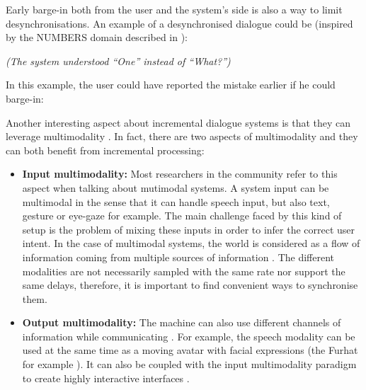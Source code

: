                   Early barge-in both from the user and the system's side is also a way to limit desynchronisations. An example of a desynchronised dialogue could be (inspired by the NUMBERS domain described in \cite{Skantze2009}):
                  
                  \begin{dialogue}
                     \textit{(The system understood ``One'' instead of ``What?'')}
                    \end{dialogue}
                    
                    In this example, the user could have reported the mistake earlier if he could barge-in:
                    
                    \begin{dialogue}
                      \end{dialogue}
                      
                      Another interesting aspect about incremental dialogue systems is that they can leverage multimodality \cite{Fink1998}. In fact, there are two aspects of multimodality and they can both benefit from incremental processing:
                      
                      \begin{itemize}
                           \item \textbf{Input multimodality:} Most researchers in the community refer to this aspect when talking about mutimodal systems. A system input can be multimodal in the sense that it can handle speech input, but also text, gesture or eye-gaze for example. The main challenge faced by this kind of setup is the problem of mixing these inputs in order to infer the correct user intent. In the case of multimodal systems, the world is considered as a flow of information coming from multiple sources of information \cite{Chao2012,Rosenthal2013}. The different modalities are not necessarily sampled with the same rate nor support the same delays, therefore, it is important to find convenient ways to synchronise them.
                                \item \textbf{Output multimodality:} The machine can also use different channels of information while communicating \cite{Matthias2009}. For example, the speech modality can be used at the same time as a moving avatar with facial expressions (the Furhat for example \cite{Skantze2015}). It can also be coupled with the input multimodality paradigm to create highly interactive interfaces \cite{Johnston2014}.
                                  \end{itemize}
                                  


